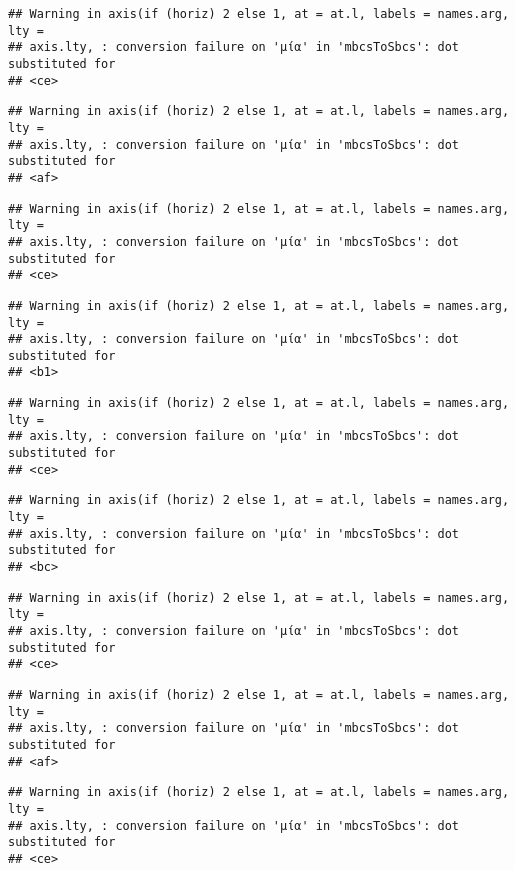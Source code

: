 \documentclass[
]{article}
\begin{document}
\begin{verbatim}
## Warning in axis(if (horiz) 2 else 1, at = at.l, labels = names.arg, lty =
## axis.lty, : conversion failure on 'μία' in 'mbcsToSbcs': dot substituted for
## <ce>
\end{verbatim}

\begin{verbatim}
## Warning in axis(if (horiz) 2 else 1, at = at.l, labels = names.arg, lty =
## axis.lty, : conversion failure on 'μία' in 'mbcsToSbcs': dot substituted for
## <af>
\end{verbatim}

\begin{verbatim}
## Warning in axis(if (horiz) 2 else 1, at = at.l, labels = names.arg, lty =
## axis.lty, : conversion failure on 'μία' in 'mbcsToSbcs': dot substituted for
## <ce>
\end{verbatim}

\begin{verbatim}
## Warning in axis(if (horiz) 2 else 1, at = at.l, labels = names.arg, lty =
## axis.lty, : conversion failure on 'μία' in 'mbcsToSbcs': dot substituted for
## <b1>
\end{verbatim}

\begin{verbatim}
## Warning in axis(if (horiz) 2 else 1, at = at.l, labels = names.arg, lty =
## axis.lty, : conversion failure on 'μία' in 'mbcsToSbcs': dot substituted for
## <ce>
\end{verbatim}

\begin{verbatim}
## Warning in axis(if (horiz) 2 else 1, at = at.l, labels = names.arg, lty =
## axis.lty, : conversion failure on 'μία' in 'mbcsToSbcs': dot substituted for
## <bc>
\end{verbatim}

\begin{verbatim}
## Warning in axis(if (horiz) 2 else 1, at = at.l, labels = names.arg, lty =
## axis.lty, : conversion failure on 'μία' in 'mbcsToSbcs': dot substituted for
## <ce>
\end{verbatim}

\begin{verbatim}
## Warning in axis(if (horiz) 2 else 1, at = at.l, labels = names.arg, lty =
## axis.lty, : conversion failure on 'μία' in 'mbcsToSbcs': dot substituted for
## <af>
\end{verbatim}

\begin{verbatim}
## Warning in axis(if (horiz) 2 else 1, at = at.l, labels = names.arg, lty =
## axis.lty, : conversion failure on 'μία' in 'mbcsToSbcs': dot substituted for
## <ce>
\end{verbatim}
\end{document}
